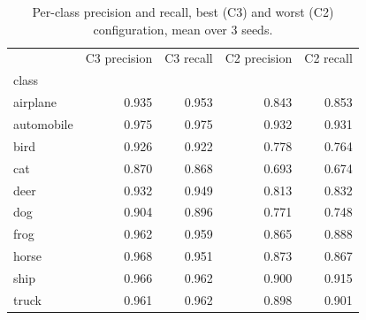 \begin{table}[t]
\caption{Per-class precision and recall, best (C3) and worst (C2) configuration, mean over 3 seeds.}
\label{tab:per_class}
\begin{tabular}{lrrrr}
\toprule
 & C3 precision & C3 recall & C2 precision & C2 recall \\
class &  &  &  &  \\
\midrule
airplane & 0.935 & 0.953 & 0.843 & 0.853 \\
automobile & 0.975 & 0.975 & 0.932 & 0.931 \\
bird & 0.926 & 0.922 & 0.778 & 0.764 \\
cat & 0.870 & 0.868 & 0.693 & 0.674 \\
deer & 0.932 & 0.949 & 0.813 & 0.832 \\
dog & 0.904 & 0.896 & 0.771 & 0.748 \\
frog & 0.962 & 0.959 & 0.865 & 0.888 \\
horse & 0.968 & 0.951 & 0.873 & 0.867 \\
ship & 0.966 & 0.962 & 0.900 & 0.915 \\
truck & 0.961 & 0.962 & 0.898 & 0.901 \\
\bottomrule
\end{tabular}
\end{table}
